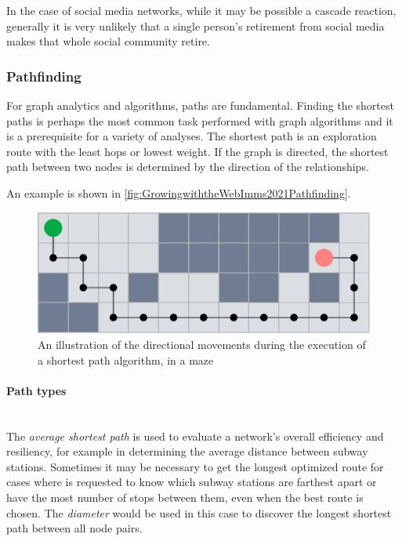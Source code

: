 In the case of social media networks, while it may be possible a cascade reaction, generally it is very unlikely that a single person's retirement from social media makes that whole social community retire.

\subsubsection[Pathfinding]{\gls{Pathfinding}} \label{subsubsection:LiteratureReview/ShortreviewofGraphTheoryconcepts/Graphanalysisandalgorithms/Pathfinding}
For graph analytics and algorithms, paths are fundamental.
Finding the \gls{shortest path}s is perhaps the most common task performed with graph algorithms and it is a prerequisite for a variety of analyses.
The shortest path is an exploration route with the least hops or lowest weight.
If the graph is directed, the shortest path between two nodes is determined by the direction of the relationships.

An example is shown in \hyperref[fig:GrowingwiththeWebImms2021Pathfinding]{\autoref{fig:GrowingwiththeWebImms2021Pathfinding}}.

\begin{figure}[H]%
	\centering%
	\includegraphics[width=1\textwidth]{images/chapter2/GrowingwiththeWebImms2021Pathfinding.pdf}%
	\caption[An illustration of the directional movements during the execution of a shortest path algorithm, in a maze]{An illustration of the directional movements during the execution of a shortest path algorithm, in a maze}%
	\label{fig:GrowingwiththeWebImms2021Pathfinding}%
\end{figure}%

\paragraph{Path types}\mbox{}\\\indent
The \textit{average shortest path} is used to evaluate a network's overall efficiency and resiliency, for example in determining the average distance between subway stations.
Sometimes it may be necessary to get the longest optimized route for cases where is requested to know which subway stations are farthest apart or have the most number of stops between them, even when the best route is chosen.
The \textit{diameter} would be used in this case to discover the longest shortest path between all node pairs.

